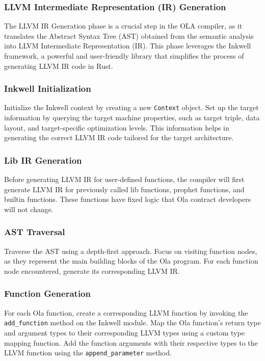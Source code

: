 \subsubsection{LLVM Intermediate Representation (IR) Generation}

The LLVM IR Generation phase is a crucial step in the OLA compiler, as it translates the Abstract Syntax Tree (AST) obtained from the semantic analysis into LLVM Intermediate Representation (IR). This phase leverages the Inkwell framework, a powerful and user-friendly library that simplifies the process of generating LLVM IR code in Rust.

\subsubsection*{Inkwell Initialization}

Initialize the Inkwell context by creating a new \texttt{Context} object. Set up the target information by querying the target machine properties, such as target triple, data layout, and target-specific optimization levels. This information helps in generating the correct LLVM IR code tailored for the target architecture.

\subsubsection*{Lib IR Generation}

Before generating LLVM IR for user-defined functions, the compiler will first generate LLVM IR for previously called lib functions, prophet functions, and builtin functions. These functions have fixed logic that Ola contract developers will not change.

\subsubsection*{AST Traversal}

Traverse the AST using a depth-first approach. Focus on visiting function nodes, as they represent the main building blocks of the Ola program. For each function node encountered, generate its corresponding LLVM IR.

\subsubsection*{Function Generation}

For each Ola function, create a corresponding LLVM function by invoking the \texttt{add\_function} method on the Inkwell module. Map the Ola function's return type and argument types to their corresponding LLVM types using a custom type mapping function. Add the function arguments with their respective types to the LLVM function using the \texttt{append\_parameter} method.

